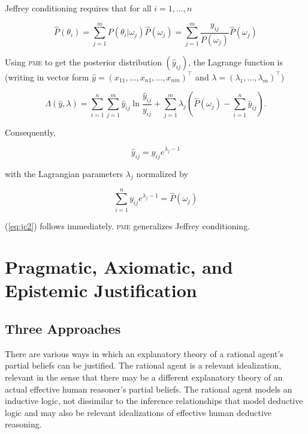 \documentclass[phd,12pt,oneside]{ubcthesis}
\begin{document}
{\noindent}Jeffrey conditioning requires that for all $i=1,\ldots,n$

\begin{equation}
  \label{eq:jc2}
  \hat{P}(\theta_{i})=\sum_{j=1}^{m}P(\theta_{i}|\omega_{j})\hat{P}(\omega_{j})=\sum_{j=1}^{m}\frac{y_{ij}}{P(\omega_{j})}\hat{P}(\omega_{j})
\end{equation}

{\noindent}Using \textsc{pme} to get the posterior distribution
$(\hat{y}_{ij})$, the Lagrange function is (writing in vector form
$\hat{y}=(x_{11},\ldots,x_{n1},\ldots,x_{nm})^{\top}$ and
$\lambda=(\lambda_{1},\ldots,\lambda_{m})^{\top}$)

\begin{equation}
  \label{eq:jclag}
  \Lambda(\hat{y},\lambda)=\sum_{i=1}^{n}\sum_{j=1}^{m}\hat{y}_{ij}\ln\frac{\hat{y}_{ij}}{y_{ij}}+\sum_{j=1}^{m}\lambda_{j}\left(\hat{P}(\omega_{j})-\sum_{i=1}^{n}\hat{y}_{ij}\right).
\end{equation}

{\noindent}Consequently,

\begin{equation}
  \label{eq:jc4}
  \hat{y}_{ij}=y_{ij}e^{\lambda_{j}-1}
\end{equation}

{\noindent}with the Lagrangian parameters $\lambda_{j}$ normalized by

\begin{equation}
  \label{eq:jc5}
  \sum_{i=1}^{n}y_{ij}e^{\lambda_{j}-1}=\hat{P}(\omega_{j})
\end{equation}

{\noindent}(\ref{eq:jc2}) follows immediately. \textsc{pme}
generalizes Jeffrey conditioning.

\section{Pragmatic, Axiomatic, and Epistemic Justification}
\label{sec:vichaina}

\subsection{Three Approaches}
\label{subsec:eiphethe}

There are various ways in which an explanatory theory of a rational
agent's partial beliefs can be justified. The rational agent is a
relevant idealization, relevant in the sense that there may be a
different explanatory theory of an actual effective human reasoner's
partial beliefs. The rational agent models an inductive logic, not
dissimilar to the inference relationships that model deductive logic
and may also be relevant idealizations of effective human deductive
reasoning.
\end{document}
